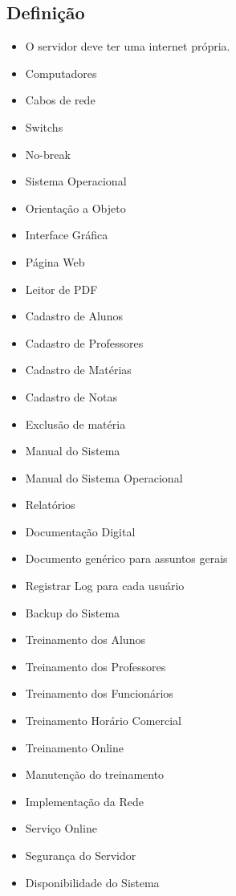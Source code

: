   \subsection{Definição}
  \begin{itemize}
      \item O servidor deve ter uma internet própria.
      \item Computadores
      \item Cabos de rede
      \item Switchs
      \item No-break
      \item Sistema Operacional
      \item Orientação a Objeto
      \item Interface Gráfica
      \item Página Web
      \item Leitor de PDF
      \item Cadastro de Alunos
      \item Cadastro de Professores
      \item Cadastro de Matérias
      \item Cadastro de Notas
      \item Exclusão de matéria
      \item Manual do Sistema
      \item Manual do Sistema Operacional
      \item Relatórios
      \item Documentação Digital
      \item Documento genérico para assuntos gerais
      \item Registrar Log para cada usuário
      \item Backup do Sistema
      \item Treinamento dos Alunos
      \item Treinamento dos Professores
      \item Treinamento dos Funcionários
      \item Treinamento Horário Comercial
      \item Treinamento Online
      \item Manutenção do treinamento
      \item Implementação da Rede
      \item Serviço Online
      \item Segurança do Servidor
      \item Disponibilidade do Sistema
  \end{itemize}
   
